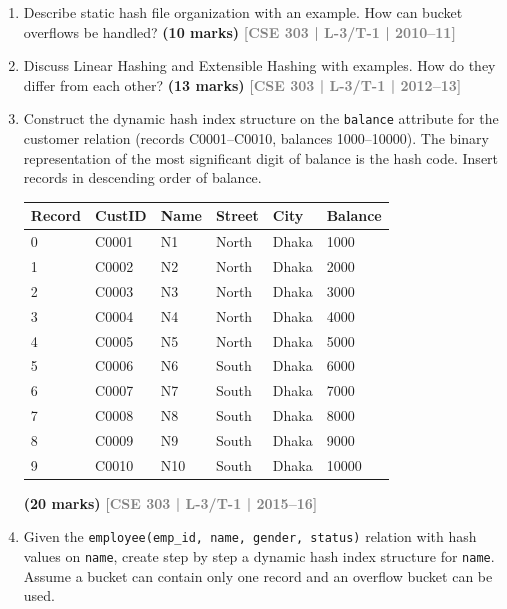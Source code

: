 \documentclass[12pt,a3paper]{article}
\newcommand{\yr}[1]{\hfill\textcolor{gray}{\small\textbf{[#1]}}}
\newcommand{\mk}[1]{\textcolor{orange!70!black}{\small\textbf{(#1 marks)}}}
\begin{document}
\begin{enumerate}

\item Describe static hash file organization with an example. How can bucket overflows be handled?
\mk{10} \yr{CSE 303 | L-3/T-1 | 2010--11}

\item Discuss Linear Hashing and Extensible Hashing with examples. How do they differ from each other?
\mk{13} \yr{CSE 303 | L-3/T-1 | 2012--13}

\item Construct the dynamic hash index structure on the \texttt{balance} attribute for the customer relation (records C0001--C0010, balances 1000--10000). The binary representation of the most significant digit of balance is the hash code. Insert records in descending order of balance.


\medskip
\begin{center}
\small
\begin{tabular}{llllll}
\toprule
\textbf{Record} & \textbf{CustID} & \textbf{Name} & \textbf{Street} & \textbf{City} & \textbf{Balance}\\
\midrule
0 & C0001 & N1 & North & Dhaka & 1000\\
1 & C0002 & N2 & North & Dhaka & 2000\\
2 & C0003 & N3 & North & Dhaka & 3000\\
3 & C0004 & N4 & North & Dhaka & 4000\\
4 & C0005 & N5 & North & Dhaka & 5000\\
5 & C0006 & N6 & South & Dhaka & 6000\\
6 & C0007 & N7 & South & Dhaka & 7000\\
7 & C0008 & N8 & South & Dhaka & 8000\\
8 & C0009 & N9 & South & Dhaka & 9000\\
9 & C0010 & N10 & South & Dhaka & 10000\\
\bottomrule
\end{tabular}
\end{center}

\mk{20} \yr{CSE 303 | L-3/T-1 | 2015--16}

\item Given the \texttt{employee(emp\_id, name, gender, status)} relation with hash values on \texttt{name}, create step by step a dynamic hash index structure for \texttt{name}. Assume a bucket can contain only one record and an overflow bucket can be used.



\end{enumerate}
\end{document}
